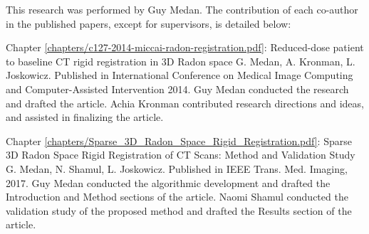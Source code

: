 \cleardoublepage


\begin{contributions}

This research was performed by Guy Medan.  The contribution of each co-author in the published papers, except for supervisors, is detailed below:

Chapter \ref{chapters/c127-2014-miccai-radon-registration.pdf}: Reduced-dose patient to baseline CT rigid registration in 3D Radon space
\newline
G. Medan, A. Kronman, L. Joskowicz. Published in International Conference on Medical Image Computing and Computer-Assisted Intervention 2014.
Guy Medan conducted the research and drafted the article. Achia Kronman contributed research directions and ideas, and assisted in finalizing the article.

Chapter \ref{chapters/Sparse_3D_Radon_Space_Rigid_Registration.pdf}: Sparse 3D Radon Space Rigid Registration of CT Scans: Method and Validation Study
\newline
G. Medan, N. Shamul, L. Joskowicz. Published in IEEE Trans. Med. Imaging, 2017.
\newline
Guy Medan conducted the algorithmic development and drafted the Introduction and Method sections of the article. Naomi Shamul conducted the validation study of the proposed method and drafted the Results section of the article.

\end{contributions}
